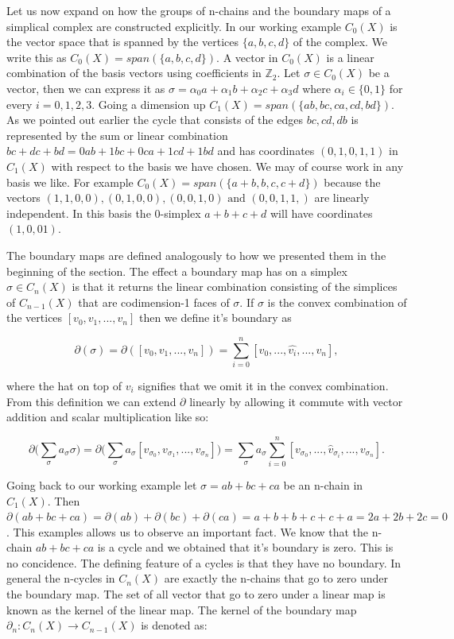 Let us now expand on how the groups of n-chains and the boundary maps of a simplical complex are constructed explicitly. In our working example $C_0(X)$ is the vector space that is spanned by the vertices $\{a, b, c, d\}$ of the complex. We write this as $C_0(X) = span(\{a, b, c, d\})$. A vector in $C_0(X)$ is a linear combination of the basis vectors using coefficients in $\mathbb{Z}_2$. Let $\sigma \in C_0(X)$ be a vector, then we can express it as $\sigma  = \alpha_0a + \alpha_1b + \alpha_2c + \alpha_3d$ where $\alpha_i \in \{0 ,1\}$ for every $i = 0, 1, 2, 3$. Going a dimension up $C_1(X) = span(\{ab, bc, ca, cd, bd\})$. As we pointed out earlier the cycle that consists of the edges $bc, cd, db$ is represented by the sum or linear combination $bc + dc + bd = 0ab + 1bc + 0ca + 1cd + 1bd$ and has coordinates $(0, 1, 0, 1, 1)$ in $C_1(X)$ with respect to the basis we have chosen. We may of course work in any basis we like. For example $C_0(X) = span(\{a + b, b, c, c + d\})$ because the vectors $(1, 1, 0, 0), (0, 1, 0, 0), (0, 0, 1, 0) \text { and } (0, 0, 1, 1,)$ are linearly independent. In this basis the 0-simplex $a + b + c + d$ will have coordinates $(1, 0, 0 1)$.

The boundary maps are defined analogously to how we presented them in the beginning of the section. The effect a boundary map has on a simplex $\sigma \in C_n(X)$ is that it returns the linear combination consisting of the simplices of $C_{n-1}(X)$ that are codimension-1 faces of $\sigma$. If $\sigma$ is the convex  combination of the vertices $[v_0, v_1, ..., v_n]$ then we define it's boundary as

$$ \partial(\sigma) = \partial([v_0, v_1, ..., v_n]) = \sum_{i=0}^{n}[v_0, ... , \hat{v_i}, ..., v_n] ,$$

where the hat on top of $v_i$ signifies that we omit it in the convex combination. From this definition we can extend $\partial$ linearly by allowing it commute with vector addition and scalar multiplication like so:

$$ \partial\bigg(\sum_{\sigma}a_{\sigma}\sigma\bigg) = \partial\bigg(\sum_{\sigma}{a_{\sigma}[v_{\sigma_0}, v_{\sigma_1}, ..., v_{\sigma_n}]}\bigg) = \sum_{\sigma}{a_{\sigma} \sum_{i=0}^{n}[v_{\sigma_0},..., \hat{v}_{\sigma_i}, ..., v_{\sigma_n}]} .$$

Going back to our working example let $\sigma = ab + bc + ca$ be an n-chain in $C_{1}(X)$. Then $\partial(ab + bc + ca) = \partial(ab) + \partial(bc) + \partial(ca) = a + b + b + c + c + a = 2a + 2b + 2c = 0$. This examples allows us to observe an important fact. We know that the n-chain $ab + bc + ca$ is a cycle and we obtained that it's boundary is zero. This is no concidence. The defining feature of a cycles is that they have no boundary. In general the n-cycles in $C_{n}(X)$ are exactly the n-chains that go to zero under the boundary map. The set of all vector that go to zero under a linear map is known as the kernel of the linear map. The kernel of the boundary map $\partial_n : C_{n}(X) \to C_{n-1}(X)$ is denoted as:

